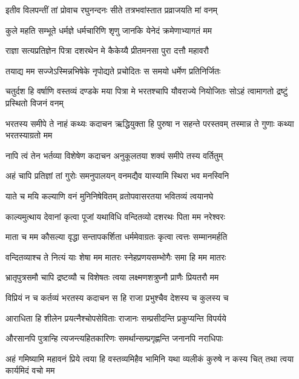 \twolineshloka
{इतीव विलपन्तीं तां प्रोवाच रघुनन्दनः}
{सीते तत्रभवांस्तात प्रव्राजयति मां वनम्} %

\twolineshloka
{कुले महति सम्भूते धर्मज्ञे धर्मचारिणि}
{शृणु जानकि येनेदं क्रमेणाभ्यागतं मम} %

\twolineshloka
{राज्ञा सत्यप्रतिज्ञेन पित्रा दशरथेन मे}
{कैकेय्यै प्रीतमनसा पुरा दत्तौ महावरौ} %

\twolineshloka
{तयाद्य मम सज्जेऽस्मिन्नभिषेके नृपोद्यते}
{प्रचोदितः स समयो धर्मेण प्रतिनिर्जितः} %

\threelineshloka
{चतुर्दश हि वर्षाणि वस्तव्यं दण्डके मया}
{पित्रा मे भरतश्चापि यौवराज्ये नियोजितः}
{सोऽहं त्वामागतो द्रष्टुं प्रस्थितो विजनं वनम्} %

\threelineshloka
{भरतस्य समीपे ते नाहं कथ्यः कदाचन}
{ऋद्धियुक्ता हि पुरुषा न सहन्ते परस्तवम्}
{तस्मान्न ते गुणाः कथ्या भरतस्याग्रतो मम} %

\twolineshloka
{नापि त्वं तेन भर्तव्या विशेषेण कदाचन}
{अनुकूलतया शक्यं समीपे तस्य वर्तितुम्} %

\twolineshloka
{अहं चापि प्रतिज्ञां तां गुरोः समनुपालयन्}
{वनमद्यैव यास्यामि स्थिरा भव मनस्विनि} %

\twolineshloka
{याते च मयि कल्याणि वनं मुनिनिषेवितम्}
{व्रतोपवासरतया भवितव्यं त्वयानघे} %

\twolineshloka
{काल्यमुत्थाय देवानां कृत्वा पूजां यथाविधि}
{वन्दितव्यो दशरथः पिता मम नरेश्वरः} %

\twolineshloka
{माता च मम कौसल्या वृद्धा सन्तापकर्शिता}
{धर्ममेवाग्रतः कृत्वा त्वत्तः सम्मानमर्हति} %

\twolineshloka
{वन्दितव्याश्च ते नित्यं याः शेषा मम मातरः}
{स्नेहप्रणयसम्भोगैः समा हि मम मातरः} %

\twolineshloka
{भ्रातृपुत्रसमौ चापि द्रष्टव्यौ च विशेषतः}
{त्वया लक्ष्मणशत्रुघ्नौ प्राणैः प्रियतरौ मम} %

\twolineshloka
{विप्रियं न च कर्तव्यं भरतस्य कदाचन}
{स हि राजा प्रभुश्चैव देशस्य च कुलस्य च} %

\twolineshloka
{आराधिता हि शीलेन प्रयत्नैश्चोपसेविताः}
{राजानः सम्प्रसीदन्ति प्रकुप्यन्ति विपर्यये} %

\twolineshloka
{औरसानपि पुत्रान्हि त्यजन्त्यहितकारिणः}
{समर्थान्सम्प्रगृह्णन्ति जनानपि नराधिपाः} %

\fourlineindentedshloka
{अहं गमिष्यामि महावनं प्रिये}
{त्वया हि वस्तव्यमिहैव भामिनि}
{यथा व्यलीकं कुरुषे न कस्य चित्}
{तथा त्वया कार्यमिदं वचो मम} %


